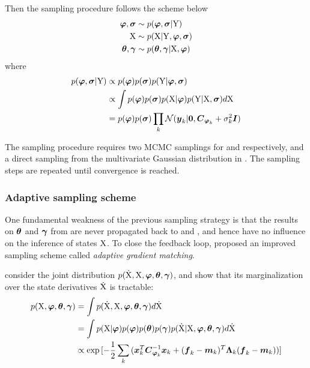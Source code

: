 Then the sampling procedure follows the scheme below
\begin{align}
    \boldsymbol{\varphi},\boldsymbol{\sigma} 
    & \sim p(\boldsymbol{\varphi},\boldsymbol{\sigma}\vert\mathrm{Y})
    \label{eq-gmgp-sample-1}
    \\
    \mathrm{X} 
    & \sim p(\mathrm{X}\vert\mathrm{Y},\boldsymbol{\varphi},\boldsymbol{\sigma})
    \label{eq-gmgp-sample-2}
    \\
    \boldsymbol{\theta},\boldsymbol{\gamma} 
    & \sim p(\boldsymbol{\theta},\boldsymbol{\gamma}\vert\mathrm{X},\boldsymbol{\varphi})
    \label{eq-gmgp-sample-3}    
\end{align}
where 
\begin{align}
    p(\boldsymbol{\varphi}, \boldsymbol{\sigma}\vert\mathrm{Y}) 
    & \propto p(\boldsymbol{\varphi}) p(\boldsymbol{\sigma}) p(\mathrm{Y}\vert\boldsymbol{\varphi},\boldsymbol{\sigma}) 
    \nonumber
    \\
    & \propto \int{
        p(\boldsymbol{\ensuremath{\varphi}}) p(\boldsymbol{\sigma}) p(\mathrm{X}\vert\boldsymbol{\ensuremath{\varphi}}) p(\mathrm{Y}\vert\mathrm{X},\boldsymbol{\sigma})d\mathrm{X}}
    \nonumber
    \\
    & = p(\boldsymbol{\varphi}) p(\boldsymbol{\sigma})\prod_k{\mathcal{N}(\boldsymbol{y}_{k}\vert\boldsymbol{0}, \boldsymbol{C}_{\boldsymbol{\varphi}_{k}} + \sigma_{k}^2\boldsymbol{I})}    
    \nonumber
\end{align}

The sampling procedure requires two MCMC samplings for  and  respectively, and a direct sampling from the multivariate Gaussian distribution in .
The sampling steps are repeated until convergence is reached.

\subsubsection*{Adaptive sampling scheme}
One fundamental weakness of the previous sampling strategy is that the results on $\boldsymbol{\theta}$ and $\boldsymbol{\gamma}$ from  are never propagated back to  and , and hence have no influence on the inference of states $\mathrm{X}$.
To close the feedback loop, \cite{dondelinger2013ode} proposed an improved sampling scheme called \emph{adaptive gradient matching}.

\cite{dondelinger2013ode} consider the joint distribution $p(\mathrm{\dot{X}},\mathrm{X},\boldsymbol{\varphi},\boldsymbol{\theta},\boldsymbol{\gamma})$, and show that its marginalization over the state derivatives $\mathrm{\dot{X}}$ is tractable:
\begin{align}
    p(\mathrm{X},\boldsymbol{\varphi},\boldsymbol{\theta},\boldsymbol{\gamma})
    & = \int{
        p(\mathrm{\dot{X}},\mathrm{X},\boldsymbol{\ensuremath{\varphi}},\boldsymbol{\theta},\boldsymbol{\gamma}) d\mathrm{\dot{X}}}
    \nonumber
    \\
    & = \int{
        p(\mathrm{X}\vert\boldsymbol{\ensuremath{\varphi}}) p(\boldsymbol{\ensuremath{\varphi}}) p(\boldsymbol{\theta}) p(\boldsymbol{\gamma}) p(\mathrm{\dot{X}}\vert\mathrm{X},\boldsymbol{\ensuremath{\varphi}},\boldsymbol{\theta},\boldsymbol{\gamma}) d\mathrm{\dot{X}}}
    \nonumber
    \\
    & \propto \exp{[
        -\frac{1}{2}\sum_k{
            (\boldsymbol{x}_{k}^T\boldsymbol{C}_{\boldsymbol{\ensuremath{\varphi}}_{k}}^{-1}\boldsymbol{x}_{k} + (\boldsymbol{f}_{k} - \boldsymbol{m}_{k})^T\boldsymbol{\Lambda}_{k}(\boldsymbol{f}_{k} - \boldsymbol{m}_{k}))}]}
\end{align}

